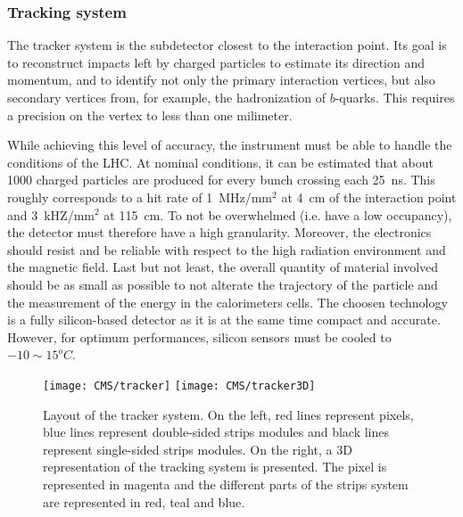 
            \subsubsection{Tracking system}

        The tracker system is the subdetector closest to the interaction point. Its goal
        is to reconstruct impacts left by charged particles to estimate its direction
        and momentum, and to identify not only the primary interaction vertices, but also
        secondary vertices from, for example, the hadronization of $b$-quarks. This requires
        a precision on the vertex to less than one milimeter.

        While achieving this level of accuracy, the instrument must be able to handle the conditions of
        the LHC. At nominal conditions, it can be estimated that about 1000 charged particles
        are produced for every bunch crossing each 25~ns. This roughly corresponds to a
        hit rate of 1~MHz/mm$^2$ at 4~cm of the interaction point and 3~kHZ/mm$^2$ at 115~cm.
        To not be overwhelmed (i.e. have a low occupancy), the detector must therefore
        have a high granularity. Moreover, the electronics should resist and be reliable with
        respect to the high radiation environment and the magnetic field. Last but not
        least, the overall quantity of material involved should be as small as possible
        to not alterate the trajectory of the particle and the measurement of the energy
        in the calorimeters cells. The choosen technology is a fully
        silicon-based detector as it is at the same time compact and accurate. However,
        for optimum performances, silicon sensors must be cooled to $-10\sim15^oC$.

        \begin{figure}[h!]
            \centering
            \texttt{[image: CMS/tracker]}
            \texttt{[image: CMS/tracker3D]}
            \caption{Layout of the tracker system.
            On the left, red lines represent pixels, blue lines represent double-sided
            strips modules and black lines represent single-sided strips modules. On the
            right, a 3D representation of the tracking system is presented. The pixel
            is represented in magenta and the different parts of the strips system are
            represented in red, teal and blue.}
            \label{fig:CMS/tracker}
        \end{figure}

